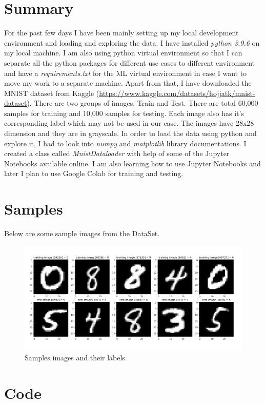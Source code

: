 \documentclass{article}
\begin{document}
\thispagestyle{firstpage}

\section{Summary}
For the past few days I have been mainly setting up my local development environment and loading and exploring the data. I have installed \emph{python 3.9.6} on my local machine. I am also using python virtual environment so that I can separate all the python packages for different use cases to different environment and have a \emph{requirements.txt} for the ML virtual environment in case I want to move my work to a separate machine. Apart from that, I have downloaded the MNIST dataset from Kaggle (\url{https://www.kaggle.com/datasets/hojjatk/mnist-dataset}). There are two groups of images, Train and Test. There are total 60,000 samples for training and 10,000 samples for testing. Each image also has it's corresponding label which may not be used in our case. The images have 28x28 dimension and they are in grayscale. In order to load the data using python and explore it, I had to look into \emph{numpy} and \emph{matplotlib} library documentations. I created a class called \emph{MnistDataloader} with help of some of the Jupyter Notebooks available online. I am also learning how to use Jupyter Notebooks and later I plan to use Google Colab for training and testing.

\section{Samples}
Below are some sample images from the DataSet.
\begin{figure}[H]
  \includegraphics[width=\linewidth]{images/sample_images.png}
  \caption{Samples images and their labels}
\end{figure}

\section{Code}
\end{document}
